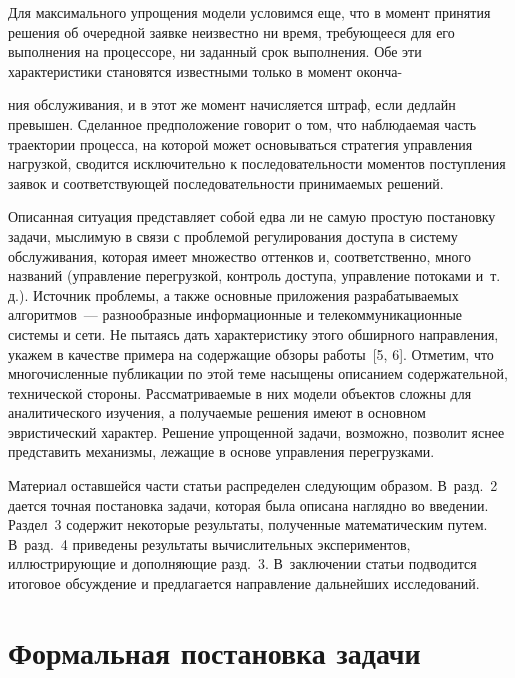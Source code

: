 \begin{multicols}{2}
     Для максимального упрощения модели условимся еще, что в момент принятия 
решения об очередной заявке неизвестно ни время, требующееся для его выполнения на 
процессоре, ни заданный срок выполнения. Обе эти характеристики становятся 
известными только в момент оконча-\linebreak\vspace*{-12pt}
\pagebreak

\noindent
ния обслуживания, и в этот же момент начисляется 
штраф, если дедлайн превышен. Сделанное предположение говорит о том, что 
наблюдаемая часть траектории процесса, на которой может основываться стратегия 
управления нагрузкой, сводится исключительно к последовательности моментов 
поступления заявок и соответствующей последовательности принимаемых решений.
     
     Описанная ситуация представляет собой едва ли не самую простую постановку 
задачи, мыслимую в связи с проблемой регулирования доступа в систему обслуживания, 
которая имеет множество оттенков и, соответственно, много названий (управ\-ле\-ние 
перегрузкой, контроль доступа, управ\-ле\-ние потоками и~т.\,д.). Источник проблемы, а 
также основные приложения разрабатываемых алгоритмов~--- разнообразные 
информационные и телекоммуникационные системы и сети. Не пытаясь дать 
характеристику этого обширного на\-прав\-ле\-ния, укажем в качестве примера на содержащие 
обзоры работы~[5, 6]. Отметим, что многочисленные пуб\-ли\-ка\-ции по этой теме насыщены 
описанием содержательной, технической стороны. Рассматриваемые в них модели 
объектов сложны для аналитического изучения, а получаемые решения имеют в основном 
эвристический характер. Решение упрощенной задачи, возможно, позволит яснее 
представить механизмы, лежащие в основе управления перегрузками.
     
     Материал оставшейся части статьи распределен следующим образом. В~разд.~2 
дается точная постановка задачи, которая была описана наглядно во введении. Раздел~3 
содержит некоторые результаты, полученные математическим путем. В~разд.~4 
приведены результаты вычислительных экспериментов, иллюстрирующие и 
дополняющие разд.~3. В~заключении статьи подводится итоговое об\-суж\-де\-ние и 
предлагается направление дальнейших исследований.

\section{Формальная постановка задачи}


\end{multicols}

